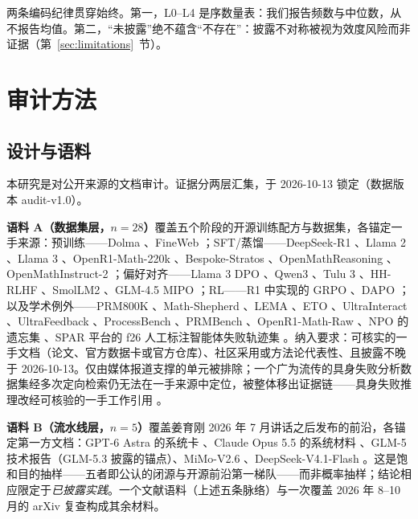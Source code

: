 \documentclass[10pt,fontset=fandol]{ctexart}
\begin{document}
两条编码纪律贯穿始终。第一，L0--L4 是序数量表：我们报告频数与中位数，从不报告均值。第二，“未披露”绝不蕴含“不存在”：披露不对称被视为效度风险而非证据（第~\ref{sec:limitations}~节）。

\section{审计方法}\label{sec:method}

\subsection{设计与语料}

本研究是对公开来源的文档审计。证据分两层汇集，于 2026-10-13 锁定（数据版本 audit-v1.0）。

\textbf{语料 A（数据集层，$n{=}28$）}覆盖五个阶段的开源训练配方与数据集，各锚定一手来源：预训练——Dolma \cite{ai22024dolma}、FineWeb \cite{hf2024fineweb}；SFT/蒸馏——DeepSeek-R1 \cite{deepseek2025r1}、Llama 2 \cite{touvron2023llama2}、Llama 3 \cite{grattafiori2024llama3}、OpenR1-Math-220k \cite{hf2025openr1}、Bespoke-Stratos \cite{bespokelabs2025stratos}、OpenMathReasoning \cite{nvidia2025omr}、OpenMathInstruct-2 \cite{nvidia2024omi2}；偏好对齐——Llama 3 DPO \cite{grattafiori2024llama3}、Qwen3 \cite{qwen2025qwen3}、Tulu 3 \cite{lambert2025tulu3}、HH-RLHF \cite{anthropic2022hhrlhf}、SmolLM2 \cite{hftb2024smoltalk}、GLM-4.5 MIPO \cite{zai2025glm45}；RL——R1 中实现的 GRPO \cite{deepseek2025r1}、DAPO \cite{yu2025dapo}；以及学术例外——PRM800K \cite{lightman2023verify}、Math-Shepherd \cite{wang2024mathshepherd}、LEMA \cite{an2023lema}、ETO \cite{song2024eto}、UltraInteract \cite{yuan2024ultrainteract}、UltraFeedback \cite{openbmb2023ultrafeedback}、ProcessBench \cite{zheng2024processbench}、PRMBench \cite{song2025prmbench}、OpenR1-Math-Raw \cite{openr12025mathraw}、NPO 的遗忘集 \cite{zhang2024npo}、SPAR 平台的 f26 人工标注智能体失败轨迹集 \cite{spar2026f26}。纳入要求：可核实的一手文档（论文、官方数据卡或官方仓库）、社区采用或方法论代表性、且披露不晚于 2026-10-13。仅由媒体报道支撑的单元被排除；一个广为流传的具身失败分析数据集经多次定向检索仍无法在一手来源中定位，被整体移出证据链——具身失败推理改经可核验的一手工作引用 \cite{duan2024aha}。

\textbf{语料 B（流水线层，$n{=}5$）}覆盖姜育刚 2026 年 7 月讲话之后发布的前沿，各锚定第一方文档：GPT-6 Astra 的系统卡 \cite{openai2026gpt6}、Claude Opus 5.5 的系统材料 \cite{anthropic2026claude}、GLM-5 技术报告（GLM-5.3 披露的锚点）\cite{zai2026glm5}、MiMo-V2.6 \cite{xiaomi2026mimo}、DeepSeek-V4.1-Flash \cite{deepseek2026v41}。这是饱和目的抽样——五者即公认的闭源与开源前沿第一梯队——而非概率抽样；结论相应限定于\emph{已披露实践}。一个文献语料（上述五条脉络）与一次覆盖 2026 年 8--10 月的 arXiv 复查构成其余材料。
\end{document}
